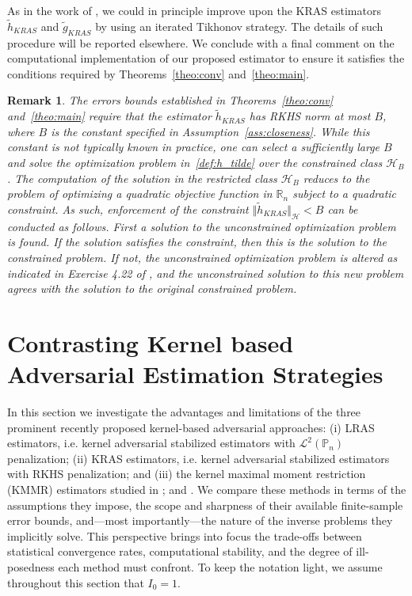 \documentclass[twoside,11pt]{article}
\newtheorem{remark}{Remark}
\newcommand{\mc}{\mathcal}
\begin{document}
As in the work of \cite{bennett2023source}, we could in principle improve upon the KRAS estimators $\tilde {h}_{KRAS}$ and $\tilde {g}_{KRAS}$ by using an iterated Tikhonov strategy. The details of such procedure will be reported elsewhere. We conclude with a final comment on the computational implementation of our proposed estimator to ensure it satisfies the conditions required by Theorems~\ref{theo:conv} and~\ref{theo:main}.
\begin{remark}
    The errors bounds established in Theorems~\ref{theo:conv} and~\ref{theo:main} require that the estimator $\tilde {h}_{KRAS}$ has RKHS norm at most $B$, where $B$ is the constant specified in Assumption~\ref{ass:closeness}. While this constant is not typically known in practice, one can select a sufficiently large $B$ and solve the optimization problem in~\eqref{def:h_tilde} over the constrained class $\mc{H}_{B}$. The computation of the solution in the restricted class $\mc{H}_{B}$ reduces to the problem of optimizing a quadratic objective function in $\mathbb{R}_n$ subject to a quadratic constraint. As such, enforcement of the constraint $\Vert \tilde{h}_{KRAS} \Vert_{\mc{H}} < B$ can be conducted as follows. First a solution to the unconstrained optimization problem is found. If the solution satisfies the constraint, then this is the solution to the constrained problem. If not, the unconstrained optimization problem is altered as indicated in Exercise 4.22 of \cite{boyd2004convex}, and the unconstrained solution to this new problem agrees with the solution to the original constrained problem. 
\end{remark}

\section{Contrasting Kernel based Adversarial Estimation Strategies}\label{sec:rel_work}


In this section we investigate the advantages and limitations of the three prominent recently proposed kernel-based adversarial approaches:
(i) LRAS estimators, i.e. kernel adversarial stabilized estimators with $\mathcal{L}^2(\mathbb{P}_n)$ penalization;
(ii) KRAS estimators, i.e. kernel adversarial stabilized estimators with RKHS penalization; and
(iii) the kernel maximal moment restriction (KMMR) estimators studied in \cite{muandet2020kernel, mastouri2021proximal, kallus2021causal}; and \cite{zhang2023instrumental}.
We compare these methods in terms of the assumptions they impose, the scope and sharpness of their available finite-sample error bounds, and---most importantly---the nature of the inverse problems they implicitly solve. This perspective brings into focus the trade-offs between statistical convergence rates, computational stability, and the degree of ill-posedness each method must confront.
To keep the notation light, we assume throughout this section that $I_0 = 1$.
\end{document}

